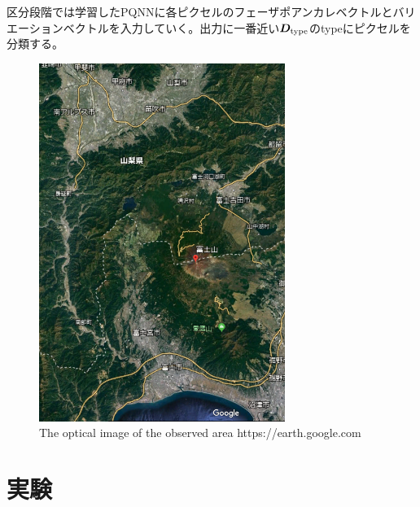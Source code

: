 \documentclass[a4j, twocolumn]{jsarticle}
\begin{document}
区分段階では学習したPQNNに各ピクセルのフェーザポアンカレベクトルとバリエーションベクトルを入力していく。出力に一番近い$\boldsymbol{D}_{\rm type}$のtypeにピクセルを分類する。
 \begin{figure}[!t]
 \centering
 \includegraphics[width=8cm]{mtfuji.png}
 \caption{The optical image of the observed area  https://earth.google.com
}
 \label{fig:optical}
\end{figure}
\section{実験}
\end{document}
